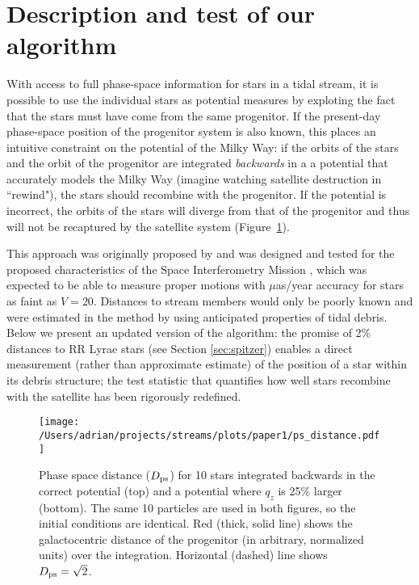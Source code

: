 \documentclass{emulateapj}
\begin{document}
\section{Description and test of our algorithm}
\label{sec:method}
With access to full phase-space information for stars in a tidal
stream, it is possible to use the individual stars as potential
measures by exploting the fact that the stars must have come from the
same progenitor. If the present-day phase-space position of the
progenitor system is also known, this places an intuitive constraint
on the potential of the Milky Way: if the orbits of the stars and the
orbit of the progenitor are integrated \emph{backwards} in a a potential that accurately models the Milky Way
(imagine watching satellite destruction in ``rewind"), the stars
should recombine with the progenitor. If the potential is incorrect,
the orbits of the stars will diverge from that of the progenitor and
thus will not be recaptured by the satellite system
(Figure~\ref{fig:ps_distance}).

This approach was originally proposed by \citet{johnston99a} and was
designed and tested for the proposed characteristics of the Space
Interferometry Mission \citep{unwin08}, which was expected to be able
to measure proper motions with $\mu$as/year accuracy for stars as
faint as $V=20$. Distances to stream members would only be poorly
known and were estimated in the method by using anticipated properties
of tidal debris. Below we present an updated version of the algorithm:
the promise of 2\% distances to RR Lyrae stars (see Section
\ref{sec:spitzer}) enables a direct measurement (rather than
approximate estimate) of the position of a star within its debris
structure; the test statistic that quantifies how well stars recombine
with the satellite has been rigorously redefined.

\begin{figure}[h]
\begin{center}
\texttt{[image: /Users/adrian/projects/streams/plots/paper1/ps\_distance.pdf]}
\caption{Phase space distance ($D_{\rm ps}$) for 10 stars integrated backwards in the correct potential (top) and a potential where $q_z$ is 25\% larger (bottom). The same 10 particles are used in both figures, so the initial conditions are identical. Red (thick, solid line) shows the galactocentric distance of the progenitor (in arbitrary, normalized units) over the integration. Horizontal (dashed) line shows $D_{\rm ps}=\sqrt{2}$.}\label{fig:ps_distance}
\end{center}
\end{figure}
\end{document}
